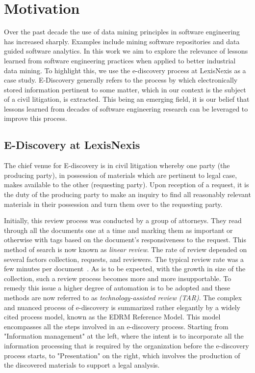 \documentclass{sig-alternate-05-2015}
\begin{document}
\section{Motivation}
Over the past decade the use of data mining principles in software engineering has increased sharply. Examples include mining software repositories and data guided software analytics. In this work we aim to explore the relevance of lessons learned from software engineering practices when applied to better industrial data mining. To highlight this, we use the e-discovery process at LexisNexis as a case study. E-Discovery generally refers to the process by which electronically stored information pertinent to some matter, which in our context is the subject of a civil litigation, is extracted. This being an emerging field, it is our belief that lessons learned from decades of software engineering research can be leveraged to improve this process.

\subsection{E-Discovery at LexisNexis}
\label{sect:edisc}
The chief venue for E-discovery is in civil litigation whereby one party (the producing party), in possession of materials which are pertinent to legal case, makes available to the other (requesting party). Upon reception of a request, it is the duty of the producing party to make an inquiry to find all reasonably relevant materials in their possession and turn them over to the requesting party.
             
Initially, this review process was conducted by a group of attorneys. They read through all the documents one at a time and marking them as important or otherwise with tags based on the document's responsiveness to the request. This method of search is now known as \textit{linear review}. The rate of review depended on several factors collection, requests, and reviewers. The typical review rate was a few minutes per document~\cite{}. As is to be expected, with the growth in size of the collection, such a review process becomes more and more insupportable. To remedy this issue a higher degree of automation is to be adopted and these methods are now referred to as \textit{technology-assisted review (TAR)}.
%
The complex and nuanced process of e-discovery is summarized rather elegantly by a widely cited process model, known as the EDRM Reference Model. This model encompasses all the steps involved in an e-discovery process. Starting from "Information management" at the left, where the intent is to incorporate all the information processing that is required by the organization before the e-discovery process starts, to "Presentation" on the right, which involves the production of the discovered materials to support a legal analysis.
\end{document}
